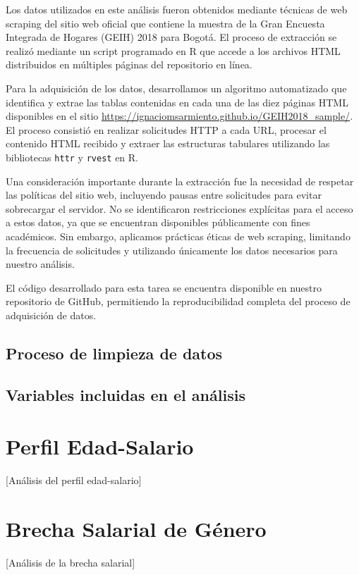 \documentclass[12pt,a4paper,onecolumn]{article}
\begin{document}
Los datos utilizados en este análisis fueron obtenidos mediante técnicas de web scraping del sitio web oficial que contiene la muestra de la Gran Encuesta Integrada de Hogares (GEIH) 2018 para Bogotá. El proceso de extracción se realizó mediante un script programado en R que accede a los archivos HTML distribuidos en múltiples páginas del repositorio en línea.

Para la adquisición de los datos, desarrollamos un algoritmo automatizado que identifica y extrae las tablas contenidas en cada una de las diez páginas HTML disponibles en el sitio \url{https://ignaciomsarmiento.github.io/GEIH2018_sample/}. El proceso consistió en realizar solicitudes HTTP a cada URL, procesar el contenido HTML recibido y extraer las estructuras tabulares utilizando las bibliotecas \texttt{httr} y \texttt{rvest} en R.

Una consideración importante durante la extracción fue la necesidad de respetar las políticas del sitio web, incluyendo pausas entre solicitudes para evitar sobrecargar el servidor. No se identificaron restricciones explícitas para el acceso a estos datos, ya que se encuentran disponibles públicamente con fines académicos. Sin embargo, aplicamos prácticas éticas de web scraping, limitando la frecuencia de solicitudes y utilizando únicamente los datos necesarios para nuestro análisis.

El código desarrollado para esta tarea se encuentra disponible en nuestro repositorio de GitHub, permitiendo la reproducibilidad completa del proceso de adquisición de datos.

\subsection{Proceso de limpieza de datos}

\subsection{Variables incluidas en el análisis}

\section{Perfil Edad-Salario}
[Análisis del perfil edad-salario]

\section{Brecha Salarial de Género}
[Análisis de la brecha salarial]
\end{document}
